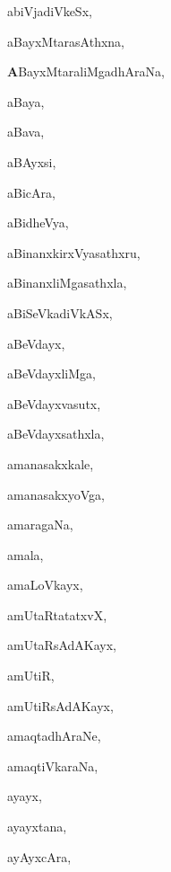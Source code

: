 \begin{multicols}{3}
{\noindent
{abiVjadiVkeSx}, \pageref{abiVjadiVkeSx}

\noindent
{aBayxMtarasAthxna}, \pageref{aBayxMtarasAthxna}

\noindent
{{\large\textbf{A}}BayxMtaraliMgadhAraNa}, \pageref{ABayxMtaraliMgadhAraNa}

\noindent
{aBaya}, \pageref{aBaya}

\noindent
{aBava}, \pageref{aBava}

\noindent
{aBAyxsi}, \pageref{aBAyxsi}

\noindent
{aBicAra}, \pageref{aBicAra}

\noindent
{aBidheVya}, \pageref{aBidheVya}

\noindent
{aBinanxkirxVyasathxru}, \pageref{aBinanxkirxVyasathxru}

\noindent
{aBinanxliMgasathxla}, \pageref{aBinanxliMgasathxla}

\noindent
{aBiSeVkadiVkASx}, \pageref{aBiSeVkadiVkASx}

\noindent
{aBeVdayx}, \pageref{aBeVdayx}

\noindent
{aBeVdayxliMga}, \pageref{aBeVdayxliMga}

\noindent
{aBeVdayxvasutx}, \pageref{aBeVdayxvasutx}

\noindent
{aBeVdayxsathxla}, \pageref{aBeVdayxsathxla}

\noindent
{amanasakxkale}, \pageref{amanasakxkale}

\noindent
{amanasakxyoVga}, \pageref{amanasakxyoVga}

\noindent
{amaragaNa}, \pageref{amaragaNa}

\noindent
{amala}, \pageref{amala}

\noindent
{amaLoVkayx}, \pageref{amaLoVkayx}

\noindent
{amUtaRtatatxvX}, \pageref{amUtaRtatatxvX}

\noindent
{amUtaRsAdAKayx}, \pageref{amUtaRsAdAKayx}

\noindent
{amUtiR}, \pageref{amUtiR}

\noindent
{amUtiRsAdAKayx}, \pageref{amUtiRsAdAKayx}

\noindent
{amaqtadhAraNe}, \pageref{amaqtadhAraNe}

\noindent
{amaqtiVkaraNa}, \pageref{amaqtiVkaraNa}

\noindent
{ayayx}, \pageref{ayayx}

\noindent
{ayayxtana}, \pageref{ayayxtana}

\noindent
{ayAyxcAra}, \pageref{ayAyxcAra}

}
\end{multicols}
